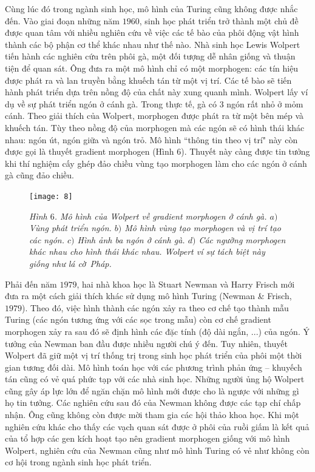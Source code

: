 \begin{multicols}{2}
	Cùng lúc đó trong ngành sinh học, mô hình của Turing cũng không được nhắc đến. Vào giai đoạn những năm $1960$, sinh học phát triển trở thành một chủ đề được quan tâm với nhiều nghiên cứu về việc các tế bào của phôi động vật hình thành các bộ phận cơ thể khác nhau như thế nào. Nhà sinh học Lewis Wolpert tiến hành các nghiên cứu trên phôi gà, một đối tượng dễ nhân giống và thuận tiện để quan sát. Ông đưa ra một mô hình chỉ có một morphogen: các tín hiệu được phát ra và lan truyền bằng khuếch tán từ một vị trí. Các tế bào sẽ tiến hành phát triển dựa trên nồng độ của chất này xung quanh mình. Wolpert lấy ví dụ về sự phát triển ngón ở cánh gà. Trong thực tế, gà có $3$ ngón rất nhỏ ở mỏm cánh. Theo giải thích của Wolpert, morphogen được phát ra từ một bên mép và khuếch tán. Tùy theo nồng độ của morphogen mà các ngón sẽ có hình thái khác nhau: ngón út, ngón giữa và ngón trỏ. Mô hình ``thông tin theo vị trí" này còn được gọi là thuyết gradient morphogen (Hình $6$). Thuyết này càng được tin tưởng khi thí nghiệm cấy ghép đảo chiều vùng tạo morphogen làm cho các ngón ở cánh gà cũng đảo chiều.
	\begin{figure}[H]
		\vspace*{-5pt}
		\centering
		\captionsetup{labelformat= empty, justification=centering}
		\texttt{[image: 8]}
		\caption{\small\textit{\color{timhieukhoahoc}Hình $6$. Mô hình của Wolpert về gradient morphogen ở cánh gà. $a)$ Vùng phát triển ngón. $b)$ Mô hình vùng tạo morphogen và vị trí tạo các ngón. $c)$ Hình ảnh ba ngón ở cánh gà. $d)$ Các ngưỡng morphogen khác nhau cho hình thái khác nhau. Wolpert ví sự tách biệt này giống như lá cờ~Pháp.}}
		\vspace*{-10pt}
	\end{figure}
	Phải đến năm $1979$, hai nhà khoa học là Stuart Newman và Harry Frisch mới đưa ra một cách giải thích khác sử dụng mô hình Turing (Newman \& Frisch, $1979$). Theo đó, việc hình thành các ngón xảy ra theo cơ chế tạo thành mẫu Turing (các ngón tương ứng với các sọc trong mẫu) còn cơ chế gradient morphogen xảy ra sau đó sẽ định hình các đặc tính (độ dài ngắn, ...) của ngón. 
	\vskip 0.05cm
	Ý tưởng của Newman ban đầu được nhiều người chú ý đến. Tuy nhiên, thuyết Wolpert đã giữ một vị trí thống trị trong sinh học phát triển của phôi một thời gian tương đối dài. Mô hình toán học với các phương trình phản ứng -- khuyếch tán cũng có vẻ quá phức tạp với các nhà sinh học. Những người ủng hộ Wolpert cũng gây áp lực lớn để ngăn chặn mô hình mới được cho là ngược với những gì họ tin tưởng. Các nghiên cứu sau đó của Newman không được các tạp chí chấp nhận. Ông cũng không còn được mời tham gia các hội thảo khoa học. Khi một nghiên cứu khác cho thấy các vạch quan sát được ở phôi của ruồi giấm là kết quả của tổ hợp các gen kích hoạt tạo nên gradient morphogen giống với mô hình Wolpert, nghiên cứu của Newman cũng như mô hình Turing có vẻ như không còn cơ hội trong ngành sinh học phát triển.

\end{multicols}
